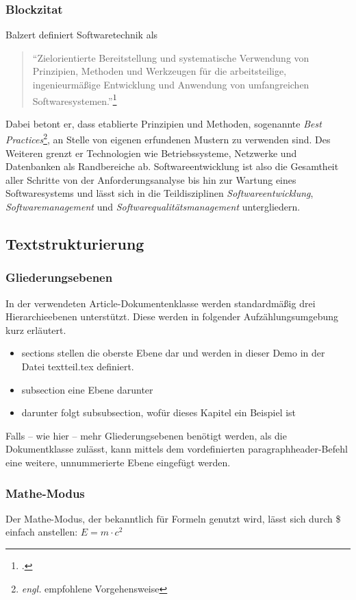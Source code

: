   \subsubsection{Blockzitat}
    Balzert definiert Softwaretechnik als
    \begin{quotation}
      \enquote{Zielorientierte Bereitstellung und systematische Verwendung von Prinzipien, Methoden und Werkzeugen
      für die arbeitsteilige, ingenieurmäßige Entwicklung und Anwendung von umfangreichen Softwaresystemen.}\footcite[S. 17]{balzert2009lehrbuch}
    \end{quotation}
    Dabei betont er, dass etablierte Prinzipien und Methoden, sogenannte 
    \emph{Best Practices}\footnote{\emph{engl.} empfohlene Vorgehensweise},
    an Stelle von eigenen erfundenen Mustern zu verwenden sind.
    Des Weiteren grenzt er Technologien wie Betriebssysteme, Netzwerke und Datenbanken als Randbereiche ab. 
    Softwareentwicklung ist also die Gesamtheit aller Schritte von der Anforderungsanalyse bis hin zur Wartung eines Softwaresystems
    und lässt sich in die Teildisziplinen \emph{Softwareentwicklung}, \emph{Softwaremanagement} und \emph{Softwarequalitätsmanagement} untergliedern.

\subsection{Textstrukturierung}
  \subsubsection{Gliederungsebenen}
    In der verwendeten Article-Dokumentenklasse werden standardmäßig drei Hierarchieebenen unterstützt.
    Diese werden in folgender Aufzählungsumgebung kurz erläutert.
    
    \begin{itemize}
      \item sections stellen die oberste Ebene dar und werden in dieser Demo in der Datei textteil.tex definiert.
      \item subsection eine Ebene darunter
      \item darunter folgt subsubsection, wofür dieses Kapitel ein Beispiel ist 
    \end{itemize}

    Falls -- wie hier -- mehr Gliederungsebenen benötigt werden, als die Dokumentklasse zulässt, 
    kann mittels dem vordefinierten paragraphheader-Befehl eine weitere, unnummerierte Ebene eingefügt werden.
   
  \subsubsection{Mathe-Modus}
    Der Mathe-Modus, der bekanntlich für Formeln genutzt wird, lässt sich durch \$ einfach anstellen:
    $E = m \cdot c^2$
